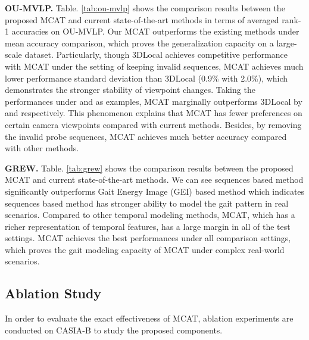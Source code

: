 \documentclass[journal]{IEEEtran}
\begin{document}
\noindent \textbf{OU-MVLP.} Table. \ref{tab:ou-mvlp} shows the comparison results between the proposed MCAT and current state-of-the-art methods in terms of averaged rank-1 accuracies on OU-MVLP. Our MCAT outperforms the existing methods under mean accuracy comparison, which proves the generalization capacity on a large-scale dataset. Particularly, though 3DLocal achieves competitive performance with MCAT under the setting of keeping invalid sequences, MCAT achieves much lower performance standard deviation than 3DLocal (0.9\% with 2.0\%), which demonstrates the stronger stability of viewpoint changes. Taking the performances under  and  as examples, MCAT marginally outperforms 3DLocal by  and  respectively. This phenomenon explains that MCAT has fewer preferences on certain camera viewpoints compared with current methods. Besides, by removing the invalid probe sequences, MCAT achieves much better accuracy compared with other methods.

\noindent \textbf{GREW.} Table. \ref{tab:grew} shows the comparison results between the proposed MCAT and current state-of-the-art methods. We can see sequences based method significantly outperforms Gait Energy Image (GEI) based method which indicates sequences based method has stronger ability to model the gait pattern in real scenarios. Compared to other temporal modeling methods, MCAT, which has a richer representation of temporal features, has a large margin in all of the test settings. MCAT achieves the best performances under all comparison settings, which proves the gait modeling capacity of MCAT under complex real-world scenarios.

\subsection{Ablation Study}
In order to evaluate the exact effectiveness of MCAT, ablation experiments are conducted on CASIA-B to study the proposed components.
\end{document}
